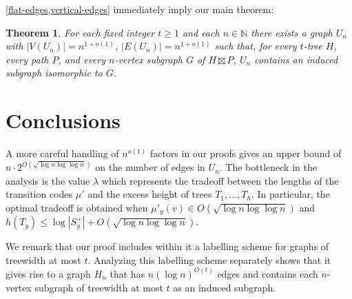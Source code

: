 \documentclass{patmorin}
\newcommand{\N}{\mathbb{N}}
\newtheorem{theorem}{Theorem}
\begin{document}
\cref{flat-edges,vertical-edges} immediately imply our main theorem:

\begin{theorem}
    For each fixed integer $t\ge 1$ and each $n\in \N$ there exists a graph $U_n$ with $|V(U_n)|=n^{1+o(1)}$, $|E(U_n)|= n^{1+o(1)}$ such that, for every $t$-tree $H$, every path $P$, and every $n$-vertex subgraph $G$ of $H\boxtimes P$, $U_n$ contains an induced subgraph isomorphic to $G$.
\end{theorem}

\section{Conclusions}
\label{summary}

A more careful handling of $n^{o(1)}$ factors in our proofs gives an upper bound of $n\cdot 2^{O(\sqrt{\log n\log\log n})}$ on the number of edges in $U_n$.  The bottleneck in the analysis is the value $\lambda$ which represents the tradeoff between the lengths of the transition codes $\mu'$ and the excess height of trees $T_1,\ldots,T_h$.  In particular, the optimal tradeoff is obtained when $\mu'_y(v)\in O(\sqrt{\log n\log\log n})$ and $h(T_y)\le \log |S^+_y| + O(\sqrt{\log n\log\log n})$.

We remark that our proof includes within it a labelling scheme for graphs of treewidth at most $t$.  Analyzing this labelling scheme separately shows that it gives rise to a graph $H_n$ that has $n(\log n)^{O(t)}$ edges and contains each $n$-vertex subgraph of treewidth at most $t$ as an induced subgraph.



\end{document}
